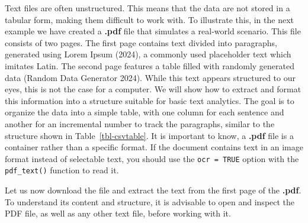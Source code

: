 Text files are often unstructured. This means
that the data are not stored in a tabular form, making them difficult to
work with. To illustrate this, in the next example we have created a
\textbf{.pdf} file that simulates a real-world scenario. This file
consists of two pages. The first page contains text divided into
paragraphs, generated using Lorem Ipsum (2024), a
commonly used placeholder text which imitates Latin. The second page features a table filled with
randomly generated data (Random Data Generator 2024). While this
text appears structured to our eyes, this is not the case for a computer. We
will show how to extract and format this information into a structure
suitable for basic text analytics. The goal is to organize the data into
a simple table, with one column for each sentence and another for an
incremental number to track the paragraphs, similar to the structure
shown in Table~\ref{tbl-csvtable}. It is important to know, a
\textbf{.pdf} file is a container rather than a specific format. If the
document contains text in an image format instead of selectable text,
you should use the \texttt{ocr\ =\ TRUE} option with the
\texttt{pdf\_text()} function to read it.

Let us now download the
file and extract the text from the first page of the \textbf{.pdf}. To
understand its content and structure, it is advisable to open and
inspect the PDF file, as well as any other text file, before working with it.

